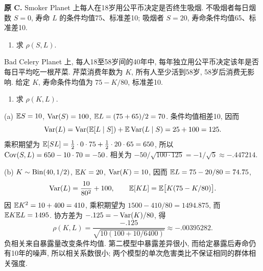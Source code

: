 \begin{exercise}\label{ex:P8.C}
\textbf{原 C.} Smoker Planet 上每人在18岁用公平币决定是否终生吸烟. 不吸烟者每日烟数 $S=0$, 寿命 $L$ 的条件均值75、标准差10; 吸烟者 $S=20$, 寿命条件均值65、标准差10.
\begin{enumerate}[label=(\alph*)]
\item\label{part:P8.C.a} 求 $\rho(S,L)$.
\end{enumerate}
Bad Celery Planet 上, 每人18至58岁间的40年中, 每年独立用公平币决定该年是否每日平均吃一根芹菜. 芹菜消费年数为 $K$, 所有人至少活到58岁, 58岁后消费无影响. 给定 $K$, 寿命条件均值为 $75-K/80$, 标准差10.
\begin{enumerate}[label=(\alph*),start=2]
\item\label{part:P8.C.b} 求 $\rho(K,L)$.
\end{enumerate}
\end{exercise}
\begin{solution}\label{sol:P8.C}
(a) $\mathbb E S=10$, $\operatorname{Var}(S)=100$, $\mathbb E L=(75+65)/2=70$. 条件均值相差10, 因而
\[
 \operatorname{Var}(L)=\operatorname{Var}(\mathbb E[L\mid S])+\mathbb E\operatorname{Var}(L\mid S)=25+100=125.
\]
乘积期望为 $\mathbb E[SL]=\frac12\cdot0\cdot75+\frac12\cdot20\cdot65=650$, 所以 $\operatorname{Cov}(S,L)=650-10\cdot70=-50$. 相关为 $-50/\sqrt{100\cdot125}=-1/\sqrt5\approx-.447214$.

(b) $K\sim\operatorname{Bin}(40,1/2)$, $\mathbb E K=20$, $\operatorname{Var}(K)=10$, 因而 $\mathbb E L=75-20/80=74.75$,
\[
 \operatorname{Var}(L)=\frac{10}{80^2}+100,\qquad
 \mathbb E[KL]=\mathbb E\bigl[K(75-K/80)\bigr].
\]
因 $\mathbb E K^2=10+400=410$, 乘积期望为 $1500-410/80=1494.875$, 而 $\mathbb E K\mathbb E L=1495$. 协方差为 $-.125=-\operatorname{Var}(K)/80$, 得
\[
 \rho(K,L)=\frac{-.125}{\sqrt{10(100+10/6400)}}\approx-.00395282.
\]
负相关来自暴露量改变条件均值. 第二模型中暴露差异很小, 而给定暴露后寿命仍有10年的噪声, 所以相关系数很小; 两个模型的单次危害类比不保证相同的群体相关强度.
\end{solution}

